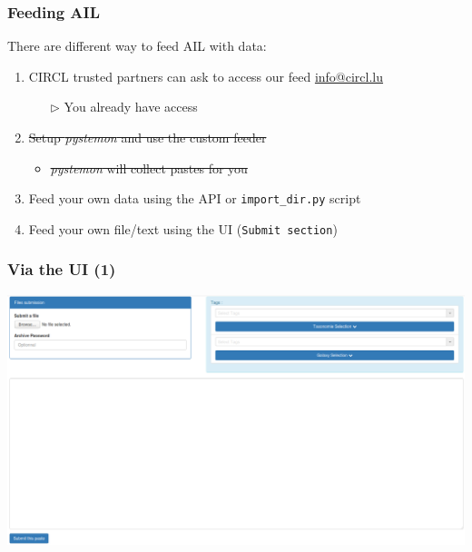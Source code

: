 \documentclass{beamer}
\begin{document}
\begin{frame}
\frametitle{Feeding AIL}
    There are different way to feed AIL with data:
    \begin{enumerate}
        \item CIRCL trusted partners can ask to access our feed {\tiny \href{mailto:info@circl.lu}{info@circl.lu}}
            \begin{itemize}
                \item[$\rhd$] You already have access
            \end{itemize}
        \item \st{Setup \textit{pystemon} and use the custom feeder}
            \begin{itemize}
                \item \st{\textit{pystemon} will collect pastes for you}
            \end{itemize}
        \item Feed your own data using the API or \texttt{import\_dir.py} script
        \item Feed your own file/text using the UI (\texttt{Submit section})
    \end{enumerate}
\end{frame}




\begin{frame}
    \frametitle{Via the UI (1)}
    \centerline{\includegraphics[scale=0.20]{screenshot/paste_submit.png}}
\end{frame}
\end{document}
